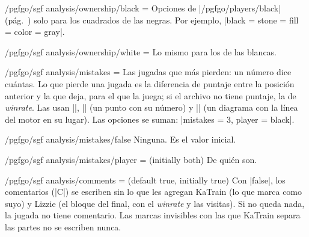 \begin{key}{/pgfgo/sgf analysis/ownership/black = }
	Opciones de |/pgfgo/players/black| (pág.~\pageref{subsec:jugadores}) solo para los cuadrados de las negras. Por ejemplo, |black = {stone = {fill = {color = gray}}}|.
\end{key}

\begin{key}{/pgfgo/sgf analysis/ownership/white = }
	Lo mismo para los de las blancas.

	\begin{codeexample}[]
		\begin{goban}[9, scale = 0.6]
		\end{goban}
	\end{codeexample}
\end{key}

\begin{key}{/pgfgo/sgf analysis/mistakes = }
	Las jugadas que más pierden: un número dice cuántas. Lo que pierde una jugada es la diferencia de puntaje entre la posición anterior y la que deja, para el que la juega; si el archivo no tiene puntaje, la de \emph{winrate}. Las usan ||, |\sgfgraph| (un punto con su número) y |\sgfdiagrams| (un diagrama con la línea del motor en su lugar). Las opciones se suman: |mistakes = {3, player = black}|.
\end{key}

\begin{stylekey}{/pgfgo/sgf analysis/mistakes/false}
	Ninguna. Es el valor inicial.
\end{stylekey}

\begin{key}{/pgfgo/sgf analysis/mistakes/player =  (initially both)}
	De quién son.
\end{key}

\begin{key}{/pgfgo/sgf analysis/comments =  (default true, initially true)}
	Con |false|, los comentarios (|C|) se escriben sin lo que les agregan KaTrain (lo que marca como suyo) y Lizzie (el bloque del final, con el \emph{winrate} y las visitas). Si no queda nada, la jugada no tiene comentario. Las marcas invisibles con las que KaTrain separa las partes no se escriben nunca.

	\begin{codeexample}
	\end{codeexample}
\end{key}

